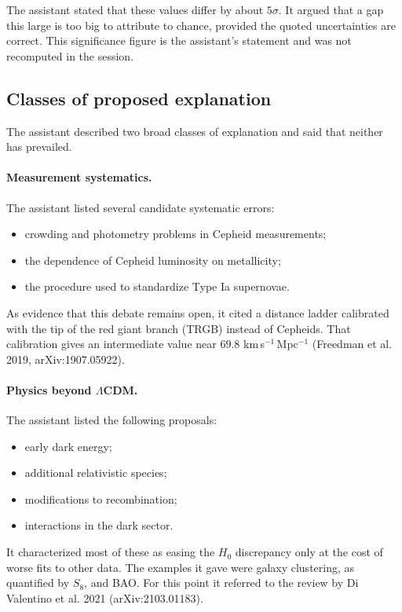 \documentclass[11pt,a4paper]{article}
\begin{document}
The assistant stated that these values differ by about $5\sigma$. It argued that a gap this large is too big to attribute to chance, provided the quoted uncertainties are correct. This significance figure is the assistant's statement and was not recomputed in the session.

\subsection{Classes of proposed explanation}
The assistant described two broad classes of explanation and said that neither has prevailed.

\paragraph{Measurement systematics.} The assistant listed several candidate systematic errors:
\begin{itemize}
\item crowding and photometry problems in Cepheid measurements;
\item the dependence of Cepheid luminosity on metallicity;
\item the procedure used to standardize Type Ia supernovae.
\end{itemize}
As evidence that this debate remains open, it cited a distance ladder calibrated with the tip of the red giant branch (TRGB) instead of Cepheids. That calibration gives an intermediate value near $69.8$ km\,s$^{-1}$\,Mpc$^{-1}$ (Freedman et al. 2019, arXiv:1907.05922).

\paragraph{Physics beyond $\Lambda$CDM.} The assistant listed the following proposals:
\begin{itemize}
\item early dark energy;
\item additional relativistic species;
\item modifications to recombination;
\item interactions in the dark sector.
\end{itemize}
It characterized most of these as easing the $H_0$ discrepancy only at the cost of worse fits to other data. The examples it gave were galaxy clustering, as quantified by $S_8$, and BAO. For this point it referred to the review by Di Valentino et al. 2021 (arXiv:2103.01183).
\end{document}
